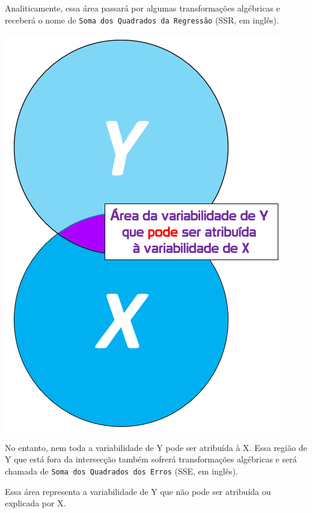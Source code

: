 \documentclass[
]{book}
\begin{document}
Analiticamente, essa área passará por algumas transformações algébricas e receberá o nome de \texttt{Soma\ dos\ Quadrados\ da\ Regressão} (SSR, em inglês).

\includegraphics{./img/cap_reg_xy_SSR.png}

No entanto, nem toda a variabilidade de Y pode ser atribuída à X. Essa região de Y que está fora da intersecção também sofrerá transformações algébricas e será chamada de \texttt{Soma\ dos\ Quadrados\ dos\ Erros} (SSE, em inglês).

Essa área representa a variabilidade de Y que não pode ser atribuída ou explicada por X.
\end{document}
